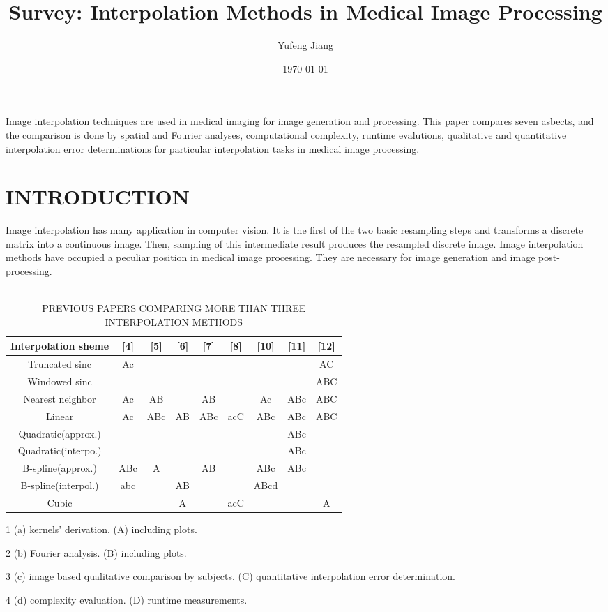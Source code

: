 \documentclass[a4paper]{article}
\title{Survey: Interpolation Methods in Medical Image Processing}
\author{Yufeng Jiang}
\date{\today}
\begin{document}
\maketitle
Image interpolation techniques are used in medical imaging for image generation and processing. This paper compares seven asbects, and the comparison is done by spatial and Fourier analyses, computational complexity, runtime evalutions, qualitative and quantitative interpolation error determinations for particular interpolation tasks in medical image processing.\\
\section{INTRODUCTION}
Image interpolation has many application in computer vision. It is the first of the two basic resampling steps and transforms a discrete matrix into a continuous image. Then, sampling of this intermediate result produces the resampled discrete image. Image interpolation methods have occupied a peculiar position in medical image processing. They are necessary for image generation and image post-processing. \\
\\
\begin{table}[H]
\begin{threeparttable}
\centering
\caption{PREVIOUS PAPERS COMPARING MORE THAN THREE INTERPOLATION METHODS}
\label{tab1}
\begin{tabular}{ccccccccc}
  \hline
  Interpolation sheme & [4] & [5] & [6] & [7] & [8] & [10] & [11] & [12]  \\ 
  \hline
  Truncated sinc & Ac & & & & & & & AC  \\ 
  Windowed sinc & & & & & & & & ABC  \\ 
  Nearest neighbor & Ac & AB & & AB & & Ac & ABc & ABC  \\
  Linear & Ac & ABc & AB & ABc & acC & ABc & ABc & ABC  \\
  Quadratic(approx.) & & & & & & & ABc &  \\
  Quadratic(interpo.) & & & & & & & ABc &   \\
  B-spline(approx.) & ABc & A & & AB & & ABc & ABc \\
  B-spline(interpol.) & abc & & AB & & & ABcd & &  \\
  Cubic & & & A & & acC & & & A  \\
  \hline  
\end{tabular}
\begin{tablenotes}
\item[1] (a) kernels' derivation. (A) including plots.
\item[2] (b) Fourier analysis. (B) including plots.
\item[3] (c) image based qualitative comparison by subjects. (C) quantitative interpolation error determination. 
\item[4] (d) complexity evaluation. (D) runtime measurements.
\end{tablenotes}
\end{threeparttable}
\end{table}
\end{document}
